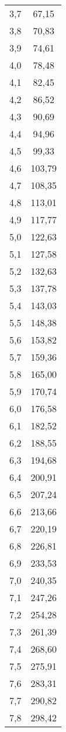 \documentclass{article}
\begin{document}
\begin{center}
\begin{longtable}{|c|c|}
3,7      & 67,15    \\
3,8      & 70,83    \\
3,9      & 74,61    \\
4,0      & 78,48    \\
4,1      & 82,45    \\
4,2      & 86,52    \\
4,3      & 90,69    \\
4,4      & 94,96    \\
4,5      & 99,33    \\
4,6      & 103,79   \\
4,7      & 108,35   \\
4,8      & 113,01   \\
4,9      & 117,77   \\
5,0      & 122,63   \\
5,1      & 127,58   \\
5,2      & 132,63   \\
5,3      & 137,78   \\
5,4      & 143,03   \\
5,5      & 148,38   \\
5,6      & 153,82   \\
5,7      & 159,36   \\
5,8      & 165,00   \\
5,9      & 170,74   \\
6,0      & 176,58   \\
6,1      & 182,52   \\
6,2      & 188,55   \\
6,3      & 194,68   \\
6,4      & 200,91   \\
6,5      & 207,24   \\
6,6      & 213,66   \\
6,7      & 220,19   \\
6,8      & 226,81   \\
6,9      & 233,53   \\
7,0      & 240,35   \\
7,1      & 247,26   \\
7,2      & 254,28   \\
7,3      & 261,39   \\
7,4      & 268,60   \\
7,5      & 275,91   \\
7,6      & 283,31   \\
7,7      & 290,82   \\
7,8      & 298,42   \\

\end{longtable}
\end{center}
\end{document}
